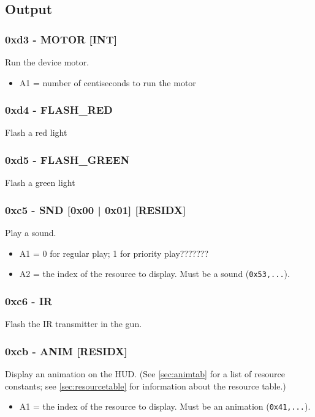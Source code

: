 \documentclass[12pt,a4paper]{scrbook}
\begin{document}
\subsection{Output}

\subsubsection{0xd3 - MOTOR [INT]}
Run the device motor.
\begin{itemize}
\item A1 = number of centiseconds to run the motor
\end{itemize}

\subsubsection{0xd4 - FLASH\_RED}
Flash a red light

\subsubsection{0xd5 - FLASH\_GREEN}
Flash a green light

\subsubsection{0xc5 - SND [0x00 | 0x01] [RESIDX] }
Play a sound.
\begin{itemize}
\item A1 = 0 for regular play; 1 for priority play???????
\item A2 = the index of the resource to display.  Must be a sound (\texttt{0x53,...}). 
\end{itemize}

\subsubsection{0xc6 - IR}
Flash the IR transmitter in the gun.

\subsubsection{0xcb - ANIM [RESIDX]}
Display an animation on the HUD.  (See \ref{sec:animtab} for a list of resource constants;
see \ref{sec:resourcetable} for information about the resource table.)
\begin{itemize}
\item A1 = the index of the resource to display.  Must be an animation (\texttt{0x41,...}).
\end{itemize}
\end{document}
